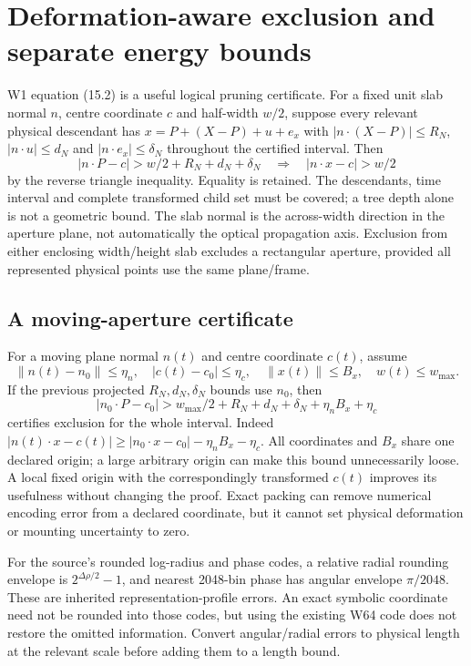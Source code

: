 \section{Deformation-aware exclusion and separate energy bounds}
\label{sec:want-pruning}
W1 equation (15.2) is a useful logical pruning certificate. For a fixed unit
slab normal $n$, centre coordinate $c$ and half-width $w/2$, suppose every
relevant physical descendant has
$x=P+(X-P)+u+e_x$ with
$|n\cdot(X-P)|\le R_N$, $|n\cdot u|\le d_N$ and
$|n\cdot e_x|\le\delta_N$ throughout the certified interval. Then
\begin{equation}
 |n\cdot P-c|>w/2+R_N+d_N+\delta_N
 \quad\Longrightarrow\quad |n\cdot x-c|>w/2
 \label{eq:want-slit-prune}
\end{equation}
by the reverse triangle inequality. Equality is retained. The descendants,
time interval and complete transformed child set must be covered; a tree
depth alone is not a geometric bound. The slab normal is the across-width
direction in the aperture plane, not automatically the optical propagation
axis. Exclusion from either enclosing width/height slab excludes a rectangular
aperture, provided all represented physical points use the same plane/frame.

\subsection{A moving-aperture certificate}
For a moving plane normal $n(t)$ and centre coordinate $c(t)$, assume
\begin{equation}
 \|n(t)-n_0\|\le\eta_n,\quad |c(t)-c_0|\le\eta_c,\quad
 \|x(t)\|\le B_x,\quad w(t)\le w_{\max}.
\end{equation}
If the previous projected $R_N,d_N,\delta_N$ bounds use $n_0$, then
\begin{equation}
 |n_0\cdot P-c_0|>
 w_{\max}/2+R_N+d_N+\delta_N+\eta_nB_x+\eta_c
 \label{eq:want-moving-prune}
\end{equation}
certifies exclusion for the whole interval. Indeed
$|n(t)\cdot x-c(t)|\ge|n_0\cdot x-c_0|-\eta_nB_x-\eta_c$.
All coordinates and $B_x$ share one declared origin; a large arbitrary
origin can make this bound unnecessarily loose. A local fixed origin with
the correspondingly transformed $c(t)$ improves its usefulness without
changing the proof. Exact packing can remove numerical encoding error from
a declared coordinate, but it cannot set physical deformation or mounting
uncertainty to zero.

For the source's rounded log-radius and phase codes, a relative radial
rounding envelope is $2^{\Delta\rho/2}-1$, and nearest 2048-bin phase has
angular envelope $\pi/2048$. These are inherited representation-profile
errors. An exact symbolic coordinate need not be rounded into those codes,
but using the existing W64 code does not restore the omitted information.
Convert angular/radial errors to physical length at the relevant scale before
adding them to a length bound.

